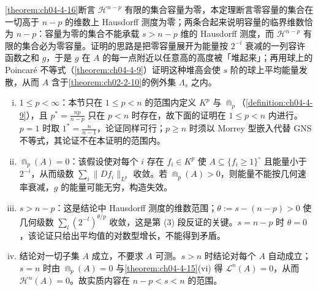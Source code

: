 \documentclass[../../main.tex]{subfiles}%
\begin{document}
\begin{remark}\label{remark:ch04-thm-4-17-动机}
\cref{theorem:ch04-4-16}断言 $\mathcal{H}^{n-p}$ 有限的集合容量为零，本定理断言零容量的集合在一切高于 $n-p$ 的维数上 Hausdorff 测度为零；两条合起来说明容量的临界维数恰为 $n-p$：容量为零的集合不能承载 $s>n-p$ 维的 Hausdorff 测度，而 $\mathcal{H}^{n-p}$ 有限的集合必为零容量。证明的思路是把零容量展开为能量按 $2^{-i}$ 衰减的一列容许函数之和 $g$，于是 $g$ 在 $A$ 的每一点附近以任意高的高度被「堆起来」；再用球上的 Poincaré 不等式（\cref{theorem:ch04-4-9}）证明这种堆高会使 $s$ 阶的球上平均能量发散，从而 $A$ 含于\cref{theorem:ch02-2-10}的例外集 $\Lambda_s$ 之内。%
\end{remark}

\begin{remark}\label{remark:ch04-thm-4-17-条件}
\begin{enumerate}[(i)]
\item $1\leqslant p<\infty$：本节只在 $1\leqslant p<n$ 的范围内定义 $K^p$ 与 $\Cap_p$（\cref{definition:ch04-4-9}），且 $p^*=\frac{np}{n-p}$ 只在 $p<n$ 时存在，故下面的证明在 $1\leqslant p<n$ 内进行。$p=1$ 时取 $1^*=\frac{n}{n-1}$，论证同样可行；$p\geqslant n$ 时须以 Morrey 型嵌入代替 GNS 不等式，其论证不在本证明的范围内。%
\item $\Cap_p(A)=0$：该假设使对每个 $i$ 存在 $f_i\in K^p$ 使 $A\subseteq\{f_i\geqslant1\}^{\circ}$ 且能量小于 $2^{-i}$，从而级数 $\sum_i\lVert Df_i\rVert_{L^p}$ 收敛。若 $\Cap_p(A)>0$，则能量不能按几何速率衰减，$g$ 的能量可能无穷，构造失效。
\item $s>n-p$：这是结论中 Hausdorff 测度的维数范围；$\theta:=s-(n-p)>0$ 使几何级数 $\sum_l(2^{-l})^{\theta/p}$ 收敛，这是第 (3) 段反证的关键。$s=n-p$ 时 $\theta=0$，该论证只给出平均值的对数型增长，不能得到矛盾。
\item 结论对一切子集 $A$ 成立，不要求 $A$ 可测。$s>n$ 时结论对每个 $A$ 自动成立；$s=n$ 时由 $\Cap_p(A)=0$ 与\cref{theorem:ch04-4-15}(vi) 得 $\mathcal{L}^n(A)=0$，从而 $\mathcal{H}^n(A)=0$。故实质内容在 $n-p<s<n$ 的范围。%
\end{enumerate}
\end{remark}
\end{document}

